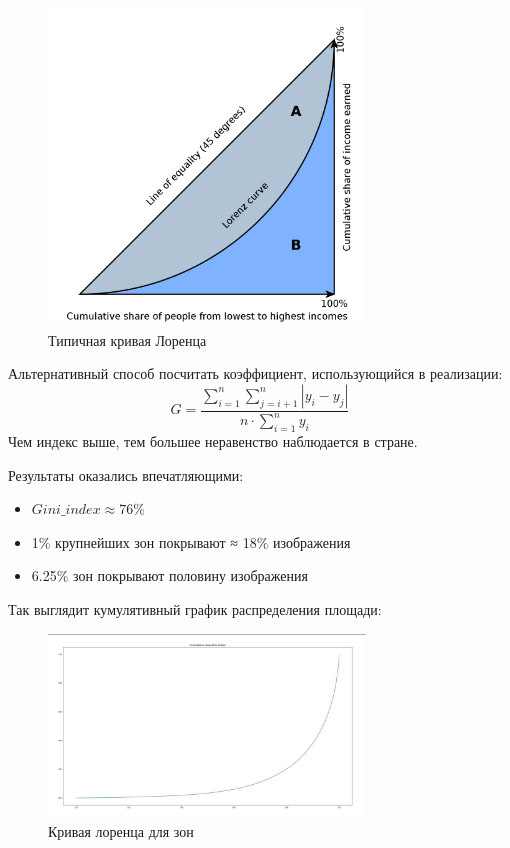 \documentclass[11pt]{article}
\begin{document}
    \begin{figure}[h!]\label{fig:lorenz_curve}
        \centering
        \includegraphics[width=0.75\textwidth]{../images/typical_lorenz_curve.png}
        \caption{Типичная кривая Лоренца}
    \end{figure}
    Альтернативный способ посчитать коэффициент, использующийся в реализации:
    \begin{equation}
        G = \frac{\sum_{i=1}^{n}  \sum_{j=i+1}^{n}  \left| y_i - y_j \right|}{n \cdot \sum_{i=1}^{n} y_i}
    \end{equation}
    Чем индекс выше, тем большее неравенство наблюдается в стране.


    Результаты оказались впечатляющими:
    \begin{itemize}
        \item $Gini\_index \approx 76\%$
        \item 1\% крупнейших зон покрывают ≈ 18\% изображения
        \item 6.25\% зон покрывают половину изображения
    \end{itemize}

    Так выглядит кумулятивный график распределения площади:
    \begin{figure}[h!]\label{fig:cumulative_inequality_graph}
        \centering
        \includegraphics[width=0.75\textwidth]{../images/cumulative_inequality_graph.jpg}
        \caption{Кривая лоренца для зон}
    \end{figure}
\end{document}
